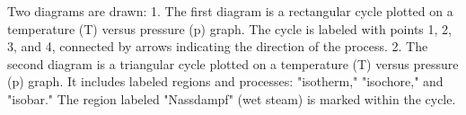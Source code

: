 Two diagrams are drawn:  
1. The first diagram is a rectangular cycle plotted on a temperature (T) versus pressure (p) graph. The cycle is labeled with points 1, 2, 3, and 4, connected by arrows indicating the direction of the process.  
2. The second diagram is a triangular cycle plotted on a temperature (T) versus pressure (p) graph. It includes labeled regions and processes: "isotherm," "isochore," and "isobar." The region labeled "Nassdampf" (wet steam) is marked within the cycle.